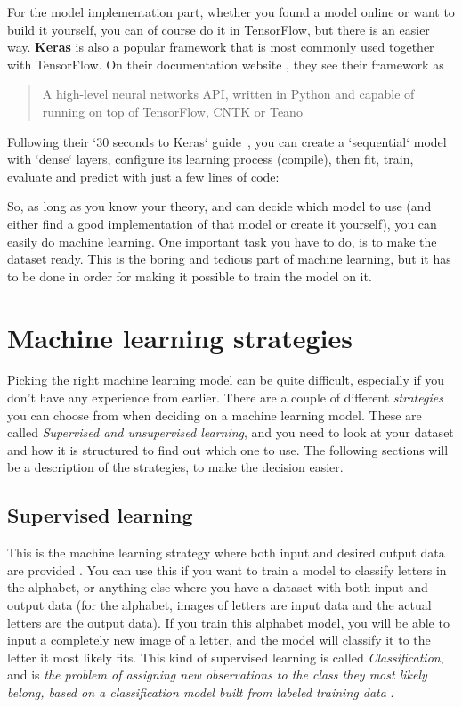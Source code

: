 For the model implementation part, whether you found a model online or want to build it yourself, you can of course do 
it in TensorFlow, but there is an easier way. \textbf{Keras} is also a popular framework that is most commonly used 
together with TensorFlow. On their documentation website \cite{keras_docs}, they see their framework as 
\blockquote{A high-level neural networks API, written in Python and capable of running on top of TensorFlow, CNTK or Teano}.

\newpage
\noindent Following their `30 seconds to Keras` guide \cite{keras_docs}, you can create a `sequential` model with `dense` 
layers, configure its learning process (compile), then fit, train, evaluate and predict with just a few lines of code: 



\noindent So, as long as you know your theory, and can decide which model to use (and either find a good 
implementation of that model or create it yourself), you can easily do machine learning. One important task 
you have to do, is to make the dataset ready. This is the boring and tedious part of machine learning, 
but it has to be done in order for making it possible to train the model on it. 


\section{Machine learning strategies}

Picking the right machine learning model can be quite difficult, especially if you don't have any experience from earlier. 
There are a couple of different \textit{strategies} you can choose from when deciding on a machine learning model.
These are called \textit{Supervised and unsupervised learning}, and you need to look at your dataset and how it is structured to find out 
which one to use. The following sections will be a description of the strategies, to make the decision easier.

\subsection{Supervised learning}
This is the machine learning strategy where both input and desired output data are provided \cite{supervised_learning_intro}. 
You can use this if you want to train a model to classify letters in the alphabet, or anything else where you have a dataset 
with both input and output data (for the alphabet, images of letters are input data and the actual letters are the output data).
If you train this alphabet model, you will be able to input a completely new image of a letter, and the model will classify it to 
the letter it most likely fits. This kind of supervised learning is called \textit{Classification}, and is 
\textit{the problem of assigning new observations to the class they most likely belong, based on a classification model built from labeled training data} 
\cite{machine_learning_for_humans_supervised_2}.

